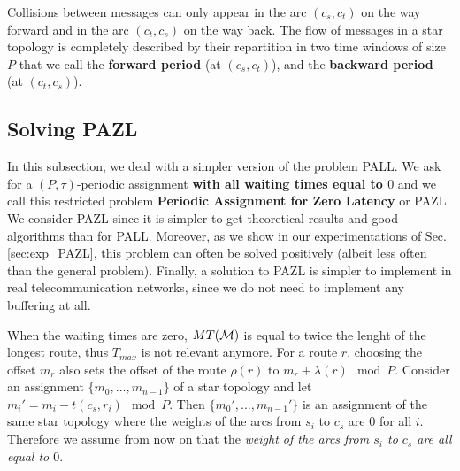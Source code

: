 \documentclass[a4paper,10pt]{article}
\begin{document}
      
      Collisions between messages can only appear in the arc $(c_s,c_t)$ on the way forward and in the arc $(c_t,c_s)$
      on the way back. The flow of messages in a star topology is completely described by their repartition in two 
      time windows of size $P$ that we call the {\bf forward period} (at $(c_s,c_t)$), and the {\bf backward period} (at $(c_t,c_s)$).
      
%       
% 

      

  \subsection{Solving PAZL}
  
  In this subsection, we deal with a simpler version of the problem PALL.
  We ask for a $(P,\tau)$-periodic assignment {\bf with all waiting times equal to $0$} and we call this restricted problem {\bf Periodic Assignment for Zero Latency} or PAZL. We consider PAZL since it is simpler to get theoretical results and good algorithms 
  than for PALL. Moreover, as we show in our experimentations of Sec.\ref{sec:exp_PAZL}, this problem can often be solved positively (albeit less often than the general problem). Finally, a solution to PAZL is simpler to implement in real telecommunication networks, since we do not need to implement any buffering at all.    
  
  When the waiting times are zero, $MT({\cal M})$ is equal to twice the lenght of the longest route, thus $T_{max}$ is not relevant anymore. For a route $r$, choosing the offset $m_r$ also sets the offset of the route $\rho(r)$ to $m_{r} + \lambda(r) \mod P$.
  Consider an assignment $\{m_0,\dots,m_{n-1}\}$ of a star topology and let $m_i'= m_{i} - t(c_s,r_i) \mod P$.
  Then $\{m_0',\dots,m_{n-1}'\}$ is an assignment of the same star topology where the weights of the arcs from $s_i$ to $c_s$ are $0$
  for all $i$. Therefore we assume from now on that the \emph{weight of the arcs from $s_i$ to $c_s$ are all equal to $0$}.
  
\end{document}
